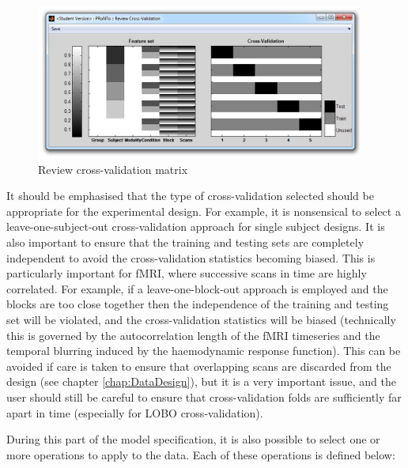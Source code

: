 \begin{figure}[!h]
\begin{center}
\includegraphics[height=2in]{images/prt_ui_reviewCV.png}
\caption{Review cross-validation matrix}
 \label{fig_reviewCV}
\end{center}
\end{figure}

It should be emphasised that the type of cross-validation selected should be appropriate for the experimental design. For example, it is nonsensical to select a leave-one-subject-out cross-validation approach for single subject designs. It is also important to ensure that the training and testing sets are completely independent to avoid the cross-validation statistics becoming biased. This is particularly important for fMRI, where successive scans in time are highly correlated. For example, if a leave-one-block-out approach is employed and the blocks are too close together then the independence of the training and testing set will be violated, and the cross-validation statistics will be biased (technically this is governed by the autocorrelation length of the fMRI timeseries and the temporal blurring induced by the haemodynamic response function). This can be avoided if care is taken to ensure that overlapping scans are discarded from the design (see chapter \ref{chap:DataDesign}), but it is a very important issue, and the user should still be careful to ensure that cross-validation folds are sufficiently far apart in time (especially for LOBO cross-validation).

During this part of the model specification, it is also possible to select one or more operations to apply to the data. Each of these operations is defined below:

